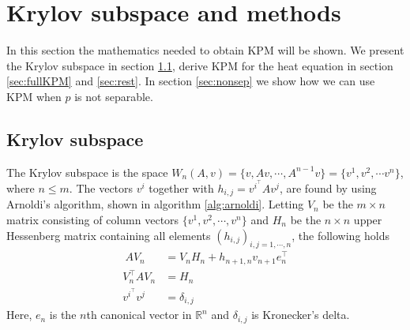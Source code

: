 \chapter{Krylov subspace and methods}%
\label{sec:krylov}
In this section the mathematics needed to obtain KPM will be shown.
We present the Krylov subspace in section \ref{sec:subspace}, derive KPM for the heat equation in section \ref{sec:fullKPM} and \ref{sec:rest}. In section \ref{sec:nonsep} we show how we can use KPM when $p$ is not separable. 


\section{Krylov subspace} \label{sec:subspace}
The Krylov subspace is the space $W_n (A,v) = \{v,Av, \cdots, A^{n-1}v\} = \{v^1,v^2,\cdots v^n\} $, where $n \leq m$. %
The vectors $v^i$ together with $h_{i,j} = v^i^\top Av^j$, are found by using Arnoldi's algorithm, shown in algorithm \ref{alg:arnoldi}. Letting $V_n$ be the $m \times n$ matrix consisting of column vectors $\{v^1,v^2,\cdots,v^n \}$ and $H_n$ be the $n \times n$ upper Hessenberg matrix containing all elements $(h_{i,j})_{i,j=1,\cdots,n}$, the following holds \cite{saad}
\begin{align}\
AV_n & = V_n H_n + h_{n+1,n}v_{n+1}e^\top_n \label{eqn:prop1} \\
V^{\top}_n AV_n &= H_n \label{eqn:prop2} \\
v^i^{\top} v^j &= \delta_{i,j} \label{eqn:prop3}
\end{align}
Here, $e_n$ is the $n$th canonical vector in $\mathbb{R}^n$ and $\delta_{i,j}$ is Kronecker's delta.\\




